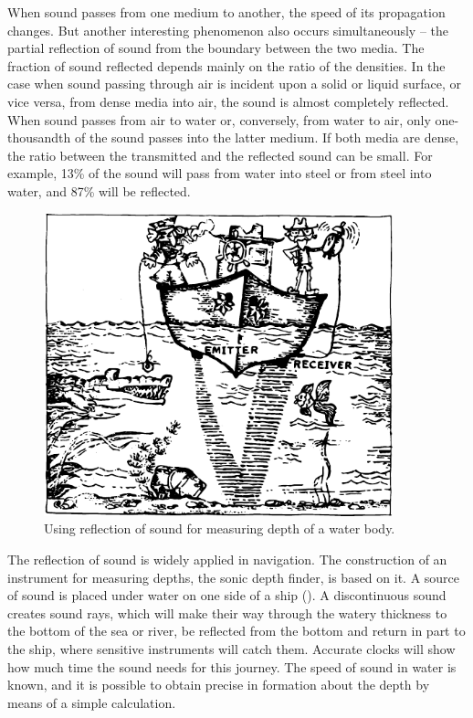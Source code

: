 When sound passes from one medium to another, the speed of its propagation changes. But another interesting phenomenon also occurs simultaneously -- the partial reflection of sound from the boundary between the two media. The fraction of sound reflected depends mainly on the ratio of the densities. In the case when sound passing through air is incident upon a solid or liquid surface, or vice versa, from dense media into air, the sound is almost completely reflected. When sound passes from air to wa­ter or, conversely, from water to air, only one-thousandth of the sound passes into the latter medium. If both media are dense, the ratio between the transmitted and the reflect­ed sound can be small. For example, 13\% of the sound will pass from water into steel or from steel into water, and 87\% will be reflected.
\begin{figure}[!ht]
\centering
\includegraphics[width=0.9\textwidth]{figures/fig-06-13.pdf}
\caption{Using reflection of sound for measuring depth of a water body.}
\label{fig-6.13}
\end{figure}
The reflection of sound is widely applied in navigation. The construction of an instrument for measuring depths, the sonic depth finder, is based on it. A source of sound is placed under water on one side of a ship (). A discontinuous sound creates sound rays, which will make their way through the watery thickness to the bottom of the sea or river, be reflected from the bottom and re­turn in part to the ship, where sensitive instruments will catch them. Accurate clocks will show how much time the sound needs for this journey. The speed of sound in water is known, and it is possible to obtain precise in­ formation about the depth by means of a simple calcula­tion.

